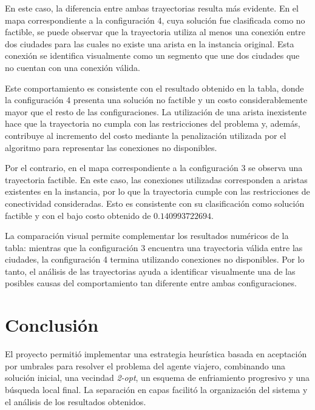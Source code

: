 \documentclass[12pt,a4paper]{article}
\begin{document}
En este caso, la diferencia entre ambas trayectorias resulta más evidente. En el mapa correspondiente a la configuración 4, cuya solución fue clasificada como no factible, se puede observar que la trayectoria utiliza al menos una conexión entre dos ciudades para las cuales no existe una arista en la instancia original. Esta conexión se identifica visualmente como un segmento que une dos ciudades que no cuentan con una conexión válida.

Este comportamiento es consistente con el resultado obtenido en la tabla, donde la configuración 4 presenta una solución no factible y un costo considerablemente mayor que el resto de las configuraciones. La utilización de una arista inexistente hace que la trayectoria no cumpla con las restricciones del problema y, además, contribuye al incremento del costo mediante la penalización utilizada por el algoritmo para representar las conexiones no disponibles.

Por el contrario, en el mapa correspondiente a la configuración 3 se observa una trayectoria factible. En este caso, las conexiones utilizadas corresponden a aristas existentes en la instancia, por lo que la trayectoria cumple con las restricciones de conectividad consideradas. Esto es consistente con su clasificación como solución factible y con el bajo costo obtenido de $0.140993722694$.

La comparación visual permite complementar los resultados numéricos de la tabla: mientras que la configuración 3 encuentra una trayectoria válida entre las ciudades, la configuración 4 termina utilizando conexiones no disponibles. Por lo tanto, el análisis de las trayectorias ayuda a identificar visualmente una de las posibles causas del comportamiento tan diferente entre ambas configuraciones.

\section{Conclusión}

El proyecto permitió implementar una estrategia heurística basada en aceptación por umbrales para resolver el problema del agente viajero, combinando una solución inicial, una vecindad \textit{2-opt}, un esquema de enfriamiento progresivo y una búsqueda local final. La separación en capas facilitó la organización del sistema y el análisis de los resultados obtenidos.
\end{document}
